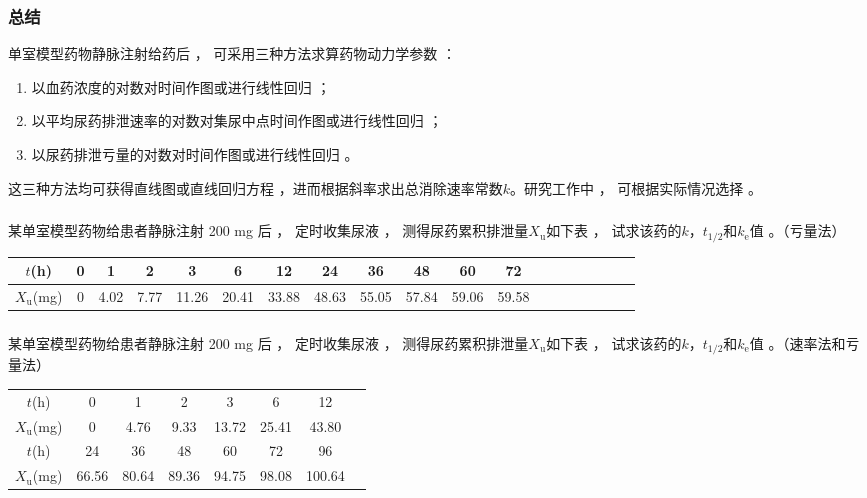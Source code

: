 \documentclass[dvipsnames, svgnames, x11names]{beamer}
\begin{document}
\begin{frame}
    \frametitle{总结}
    单室模型药物静脉注射给药后 ， 可采用三种方法求算药物动力学参数 ： 
    \begin{enumerate}
      \item 以血药浓度的对数对时间作图或进行线性回归 ；
      \item 以平均尿药排泄速率的对数对集尿中点时间作图或进行线性回归 ； 
      \item 以尿药排泄亏量的对数对时间作图或进行线性回归 。
    \end{enumerate}
      这三种方法均可获得直线图或直线回归方程 ，进而根据斜率求出总消除速率常数$k$。研究工作中 ， 可根据实际情况选择 。
\end{frame}


\begin{frame}[t]
    \frametitle{}
    \begin{example}
        某单室模型药物给患者静脉注射 200 mg 后 ， 定时收集尿液 ， 测得尿药累积排泄量$X_{\mathrm{u}}$如下表 ， 试求该药的$k$，$t_{1/2}$和$k_\mathrm{e}$值 。（亏量法）
        \small{
        \begin{table}
            \centering
            \begin{tabular}{ccccccccccccccccccc}
                \bottomrule
                $t$(h)& 0 & 1 &  2 & 3 & 6 &  12 & 24 & 36 & 48  & 60 & 72  \\ \hline
                $X_{\mathrm{u}}$(mg)& 0 & 4.02 & 7.77  & 11.26 & 20.41 &  33.88 & 48.63 & 55.05 & 57.84  & 59.06 & 59.58 \\ \toprule
            \end{tabular}
        \end{table}}
    \end{example}
\end{frame}


\begin{frame}[t]
    \frametitle{}
\begin{question}
    某单室模型药物给患者静脉注射 200 mg 后 ， 定时收集尿液 ， 测得尿药累积排泄量$X_{\mathrm{u}}$如下表 ， 试求该药的$k$，$t_{1/2}$和$k_\mathrm{e}$值 。（速率法和亏量法）
        \begin{table}
            \centering
            \begin{tabular}{cccccccc}
                \bottomrule
                $t$(h)& 0 & 1 &  2 & 3 & 6 &  12\\ 
                $X_{\mathrm{u}}$(mg)& 0 & 4.76 & 9.33 & 13.72 & 25.41 & 43.80 \\ \hline
                $t$(h)& 24 & 36 & 48  & 60 & 72 & 96 \\ 
                $X_{\mathrm{u}}$(mg) & 66.56 & 80.64 & 89.36 & 94.75 & 98.08 & 100.64 \\ \toprule
            \end{tabular}
        \end{table}
\end{question}
\end{frame}
\end{document}
